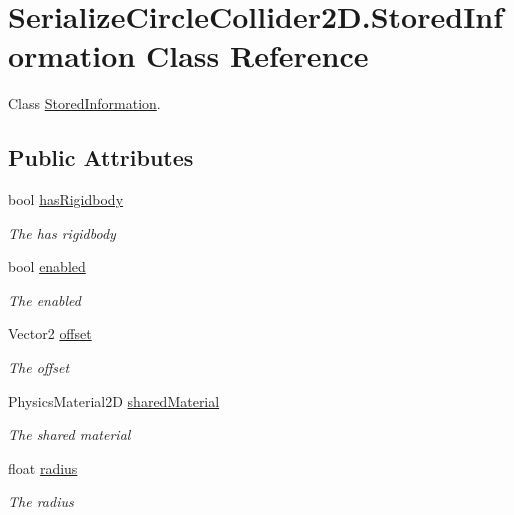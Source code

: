 \hypertarget{class_serialize_circle_collider2_d_1_1_stored_information}{}\section{Serialize\+Circle\+Collider2\+D.\+Stored\+Information Class Reference}
\label{class_serialize_circle_collider2_d_1_1_stored_information}


Class \hyperlink{class_serialize_circle_collider2_d_1_1_stored_information}{Stored\+Information}.  


\subsection*{Public Attributes}
\begin{DoxyCompactItemize}
\item 
bool \hyperlink{class_serialize_circle_collider2_d_1_1_stored_information_a1cd7e610e41f5d63c6c259cf139aacd3}{has\+Rigidbody}
\begin{DoxyCompactList}\small\item\em The has rigidbody \end{DoxyCompactList}\item 
bool \hyperlink{class_serialize_circle_collider2_d_1_1_stored_information_a4d2a3492dd35545b1758616e3e249a88}{enabled}
\begin{DoxyCompactList}\small\item\em The enabled \end{DoxyCompactList}\item 
Vector2 \hyperlink{class_serialize_circle_collider2_d_1_1_stored_information_ab1ff1327e36f3b332d36e954b2919e48}{offset}
\begin{DoxyCompactList}\small\item\em The offset \end{DoxyCompactList}\item 
Physics\+Material2D \hyperlink{class_serialize_circle_collider2_d_1_1_stored_information_aa75f2d6b0105e6203a6327eb89bfc4ec}{shared\+Material}
\begin{DoxyCompactList}\small\item\em The shared material \end{DoxyCompactList}\item 
float \hyperlink{class_serialize_circle_collider2_d_1_1_stored_information_a1568457da8081307e12181890a36189f}{radius}
\begin{DoxyCompactList}\small\item\em The radius \end{DoxyCompactList}\end{DoxyCompactItemize}


